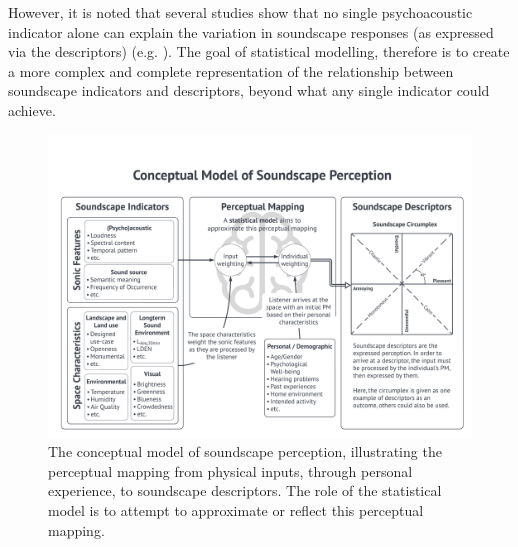 However, it is noted that several studies show that no single psychoacoustic indicator alone can explain the variation in soundscape responses (as expressed via the descriptors) (e.g. \citep{PerssonWaye2002Psycho}). The goal of statistical modelling, therefore is to create a more complex and complete representation of the relationship between soundscape indicators and descriptors, beyond what any single indicator could achieve. 

\begin{figure}[h]
  \includegraphics[width=\textwidth]{Figures/Overall Model Concept Diagram_2022-04-28.png}
  \caption{The conceptual model of soundscape perception, illustrating the perceptual mapping from physical inputs, through personal experience, to soundscape descriptors. The role of the statistical model is to attempt to approximate or reflect this perceptual mapping. \label{fig:percepMap}}
\end{figure}

